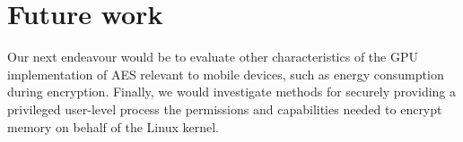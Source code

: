\documentclass[conference,10pt]{IEEEtran}
\begin{document}
\section{Future work}

Our next endeavour would be to evaluate other characteristics of the GPU implementation of AES relevant to 
mobile devices, such as energy consumption during encryption.  Finally, we would investigate methods for 
securely providing a privileged user-level process the permissions and capabilities needed to encrypt 
memory on behalf of the Linux kernel.





%
%
%
% 
% 

\end{document}
